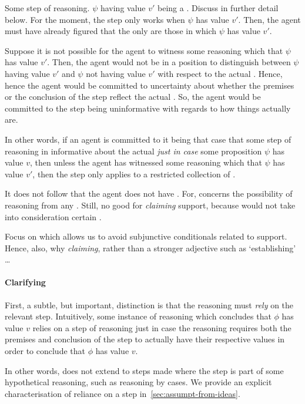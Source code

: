 \begin{note}
  Some step of reasoning.
  \(\psi\) having value \(v'\) being a \requ{}.
  Discuss in further detail below.
  For the moment, the step only works when \(\psi\) has value \(v'\).
  Then, the agent must have already figured that the only  are those in which \(\psi\) has value \(v'\).

  Suppose it is not possible for the agent to witness some reasoning which  that \(\psi\) has value \(v'\).
  Then, the agent would not be in a position to distinguish between \(\psi\) having value \(v'\) and \(\psi\) not having value \(v'\) with respect to the actual \world{}.
  Hence, hence the agent would be committed to uncertainty about whether the premises or the conclusion of the step reflect the actual \world{}.
  So, the agent would be committed to the step being uninformative with regards to how things actually are.

  In other words, if an agent is committed to it being that case that some step of reasoning in informative about the actual \world{} \emph{just in case} some proposition \(\psi\) has value \(v\), then unless the agent has witnessed some reasoning which  that \(\psi\) has value \(v'\), then the step only applies to a restricted collection of .

  It does not follow that the agent does not have \support{}.
  For, \support{} concerns the possibility of reasoning from any \epPW{}.
  Still, no good for \emph{claiming} support, because would not take into consideration certain .
\end{note}

\begin{note}
  Focus on  which allows us to avoid subjunctive conditionals related to support.
  Hence, also, why \emph{claiming}, rather than a stronger adjective such as `establishing' \dots
\end{note}

\paragraph{Clarifying \ideaCSB{}}

\begin{note}
  First, a subtle, but important, distinction is that the reasoning must \emph{rely} on the relevant step.
  Intuitively, some instance of reasoning which concludes that \(\phi\) has value \(v\) relies on a step of reasoning just in case the reasoning requires both the premises and conclusion of the step to actually have their respective values in order to conclude that \(\phi\) has value \(v\).

  In other words, \ideaCSB{} does not extend to steps made where the step is part of some hypothetical reasoning, such as reasoning by cases.
  We provide an explicit characterisation of reliance on a step in~\autoref{sec:assumpt-from-ideas}.
\end{note}

